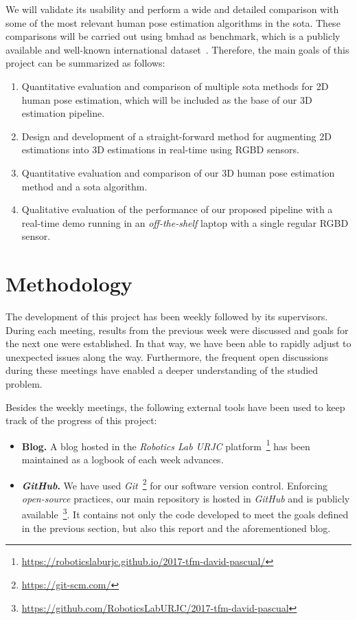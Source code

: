 We will validate its usability and perform a wide and detailed comparison with some of the most relevant human pose estimation algorithms in the \gls{sota}. These comparisons will be carried out using \gls{bmhad} as benchmark, which is a publicly available and well-known international dataset~\cite{ofli2013berkeley}. Therefore, the main goals of this project can be summarized as follows:
\begin{enumerate}
\item Quantitative evaluation and comparison of multiple \gls{sota} methods for 2D human pose estimation, which will be included as the base of our 3D estimation pipeline.
\item Design and development of a straight-forward method for augmenting 2D estimations into 3D estimations in real-time using RGBD sensors.
\item Quantitative evaluation and comparison of our 3D human pose estimation method and a \gls{sota} algorithm.
\item Qualitative evaluation of the performance of our proposed pipeline with a real-time demo running in an \emph{off-the-shelf} laptop with a single regular RGBD sensor.
\end{enumerate}

\section{Methodology}\label{ch:methodology}
The development of this project has been weekly followed by its supervisors. During each meeting, results from the previous week were discussed and goals for the next one were established. In that way, we have been able to rapidly adjust to unexpected issues along the way. Furthermore, the frequent open discussions during these meetings have enabled a deeper understanding of the studied problem.

Besides the weekly meetings, the following external tools have been used to keep track of the progress of this project:
\begin{itemize}
    \item \textbf{Blog.} A blog hosted in the \emph{Robotics Lab URJC} platform~\footnote{\url{https://roboticslaburjc.github.io/2017-tfm-david-pascual/}} has been maintained as a logbook of each week advances.
    \item \textbf{\emph{GitHub}.} We have used \emph{Git}~\footnote{\url{https://git-scm.com/}} for our software version control. Enforcing \emph{open-source} practices, our main repository is hosted in \emph{GitHub} and is publicly available~\footnote{\url{https://github.com/RoboticsLabURJC/2017-tfm-david-pascual}}. It contains not only the code developed to meet the goals defined in the previous section, but also this report and the aforementioned blog.
\end{itemize}

